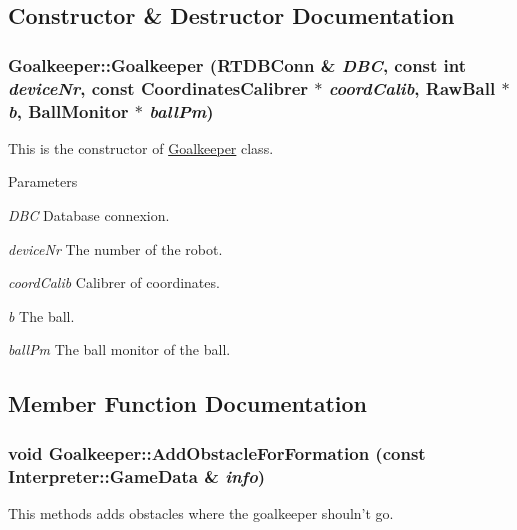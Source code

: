 \subsection{Constructor \& Destructor Documentation}
\hypertarget{classGoalkeeper_a7ad214162340c37a695ba00d4576c3c4}{
\subsubsection[{Goalkeeper}]{\setlength{\rightskip}{0pt plus 5cm}Goalkeeper::Goalkeeper (RTDBConn \& {\em DBC}, \/  const int {\em deviceNr}, \/  const {\bf CoordinatesCalibrer} $\ast$ {\em coordCalib}, \/  RawBall $\ast$ {\em b}, \/  {\bf BallMonitor} $\ast$ {\em ballPm})}}
\label{classGoalkeeper_a7ad214162340c37a695ba00d4576c3c4}


This is the constructor of \hyperlink{classGoalkeeper}{Goalkeeper} class. 


\begin{DoxyParams}{Parameters}
\item[{\em DBC}]Database connexion. \item[{\em deviceNr}]The number of the robot. \item[{\em coordCalib}]Calibrer of coordinates. \item[{\em b}]The ball. \item[{\em ballPm}]The ball monitor of the ball. \end{DoxyParams}


\subsection{Member Function Documentation}
\hypertarget{classGoalkeeper_a5287a2e74795bbec8f0ead767655da5d}{
\subsubsection[{AddObstacleForFormation}]{\setlength{\rightskip}{0pt plus 5cm}void Goalkeeper::AddObstacleForFormation (const {\bf Interpreter::GameData} \& {\em info})}}
\label{classGoalkeeper_a5287a2e74795bbec8f0ead767655da5d}


This methods adds obstacles where the goalkeeper shouln't go. 



